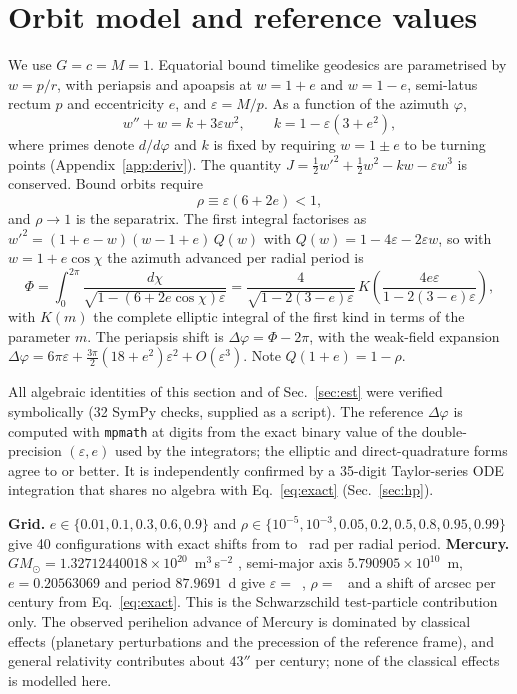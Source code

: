 \documentclass[11pt,a4paper]{article}
\newcommand{\dphi}{\Delta\varphi}
\begin{document}
\section{Orbit model and reference values}

We use $G=c=M=1$. Equatorial bound timelike geodesics are parametrised by $w=p/r$, with periapsis and apoapsis at $w=1+e$ and $w=1-e$, semi-latus rectum $p$ and eccentricity $e$, and $\varepsilon=M/p$. As a function of the azimuth $\varphi$,
\begin{equation}
w''+w = k+3\varepsilon w^{2},\qquad k=1-\varepsilon(3+e^{2}),
\label{eq:orbit}
\end{equation}
where primes denote $d/d\varphi$ and $k$ is fixed by requiring $w=1\pm e$ to be turning points (Appendix~\ref{app:deriv}). The quantity $J=\tfrac12 w'^2+\tfrac12 w^2-kw-\varepsilon w^3$ is conserved. Bound orbits require
\begin{equation}
\rho\equiv\varepsilon(6+2e)<1,
\label{eq:rho}
\end{equation}
and $\rho\to1$ is the separatrix. The first integral factorises as $w'^2=(1+e-w)(w-1+e)\,Q(w)$ with $Q(w)=1-4\varepsilon-2\varepsilon w$, so with $w=1+e\cos\chi$ the azimuth advanced per radial period is
\begin{equation}
\Phi=\int_0^{2\pi}\frac{d\chi}{\sqrt{1-(6+2e\cos\chi)\varepsilon}}
=\frac{4}{\sqrt{1-2(3-e)\varepsilon}}\,K\!\left(\frac{4e\varepsilon}{1-2(3-e)\varepsilon}\right),
\label{eq:exact}
\end{equation}
with $K(m)$ the complete elliptic integral of the first kind in terms of the parameter $m$. The periapsis shift is $\dphi=\Phi-2\pi$, with the weak-field expansion $\dphi=6\pi\varepsilon+\tfrac{3\pi}{2}(18+e^2)\varepsilon^2+O(\varepsilon^3)$. Note $Q(1+e)=1-\rho$.

All algebraic identities of this section and of Sec.~\ref{sec:est} were verified symbolically (32 SymPy checks, supplied as a script). The reference $\dphi$ is computed with \texttt{mpmath} at \MpDps{} digits from the exact binary value of the double-precision $(\varepsilon,e)$ used by the integrators; the elliptic and direct-quadrature forms agree to \RefCheckMax{} or better. It is independently confirmed by a 35-digit Taylor-series ODE integration that shares no algebra with Eq.~\eqref{eq:exact} (Sec.~\ref{sec:hp}).

\textbf{Grid.} $e\in\{0.01,0.1,0.3,0.6,0.9\}$ and $\rho\in\{10^{-5},10^{-3},0.05,0.2,0.5,0.8,0.95,0.99\}$ give 40 configurations with exact shifts from \GridShiftMin{} to \GridShiftMax{}~rad per radial period. \textbf{Mercury.} $GM_\odot=1.32712440018\times10^{20}$~m$^3$\,s$^{-2}$ \citep{Montenbruck2000}, semi-major axis $5.790905\times10^{10}$~m, $e=0.20563069$ and period $87.9691$~d \citep{NASAMercury} give $\varepsilon=$~\MercEps, $\rho=$~\MercRho{} and a shift of \MercArcsecRef{} arcsec per century from Eq.~\eqref{eq:exact}. This is the Schwarzschild test-particle contribution only. The observed perihelion advance of Mercury is dominated by classical effects (planetary perturbations and the precession of the reference frame), and general relativity contributes about $43''$ per century; none of the classical effects is modelled here.
\end{document}
